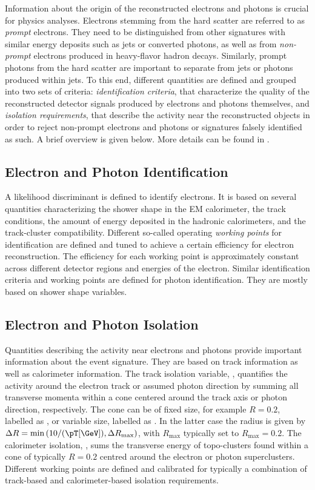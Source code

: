Information about the origin of the reconstructed electrons and photons is crucial for physics analyses.
Electrons stemming from the hard scatter are referred to as \emph{prompt} electrons. They need to be distinguished from other signatures with similar energy deposits such as jets or converted photons, as well as from \emph{non-prompt} electrons produced in heavy-flavor hadron decays.
Similarly, prompt photons from the hard scatter are important to separate from jets or photons produced within jets.
To this end, different quantities are defined and grouped into two sets of criteria: \emph{identification criteria}, that characterize the quality of the reconstructed detector signals produced by electrons and photons themselves, and \emph{isolation requirements}, that describe the activity near the reconstructed objects in order to reject non-prompt electrons and photons or signatures falsely identified as such. A brief overview is given below. More details can be found in .

\subsection{Electron and Photon Identification}
A likelihood discriminant is defined to identify electrons. It is based on several quantities characterizing the shower shape in the EM calorimeter, the track conditions, the amount of energy deposited in the hadronic calorimeters, and the track-cluster compatibility. Different so-called operating \emph{working points} for identification are defined and tuned to achieve a certain efficiency for electron reconstruction. The efficiency for each working point is approximately constant across different detector regions and energies of the electron.
Similar identification criteria and working points are defined for photon identification. They are mostly based on shower shape variables.

\subsection{Electron and Photon Isolation}
Quantities describing the activity near electrons and photons provide important information about the event signature. They are based on track information as well as calorimeter information.
The track isolation variable, \pTcone, quantifies the activity around the electron track or assumed photon direction by summing all transverse momenta within a cone centered around the track axis or photon direction, respectively. The cone can be of fixed size, for example $R=0.2$, labelled as \pTconetwenty, or variable size, labelled as \pTvarcone. In the latter case the radius is given by $\Delta R = \text{min} \left( 10 / (\pT \text{[\GeV])}, \Delta R_{\text{max}}  \right)$, with $R_{\text{max}}$ typically set to $R_{\text{max}} = 0.2$.
The calorimeter isolation, \ETconetwenty, sums the transverse energy of topo-clusters found within a cone of typically $R=0.2$ centred around the electron or photon superclusters.
Different working points are defined and calibrated for typically a combination of track-based and calorimeter-based isolation requirements.

